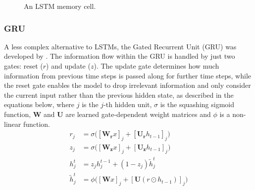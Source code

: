 \begin{figure}[htb]
	\caption[Illustration of an LSTM Memory Cell]{An LSTM memory cell.}
	\label{fig:memoryCellLSTM}
\end{figure}

\subsubsection{GRU}\label{GRU}
A less complex alternative to LSTMs, the Gated Recurrent Unit (GRU) was developed by \cite{Cho2014}. The information flow within the GRU is handled by just two gates: reset ($r$) and update ($z$). The update gate determines how much information from previous time steps is passed along for further time steps, while the reset gate enables the model to drop irrelevant information and only consider the current input rather than the previous hidden state, as described in the equations below, where $j$ is the $j$-th hidden unit, $\sigma$ is the squashing sigmoid function, $\boldsymbol{W}$ and $\boldsymbol{U}$ are learned gate-dependent weight matrices and $\phi$ is a non-linear function.
\begin{align*}
r_j &= \sigma \big( [\boldsymbol{W_{r}}x]_{j} + [\boldsymbol{U_{r}}h_{t-1}]_{j} \big) \\
z_j &= \sigma \big( [\boldsymbol{W_{z}}x]_{j} + [\boldsymbol{U_{z}}h_{t-1}]_{j} \big) \\
h_{j}^{t} &= z_{j}h_{j}^{t-1} + (1 - z_{j}) \tilde{h}_{j}^{t} \\
\tilde{h}_{j}^{t} &= \phi \big( [\boldsymbol{W}x]_{j} +[\boldsymbol{U}(r \odot h_{t-1})]_{j} \big)
\end{align*}

